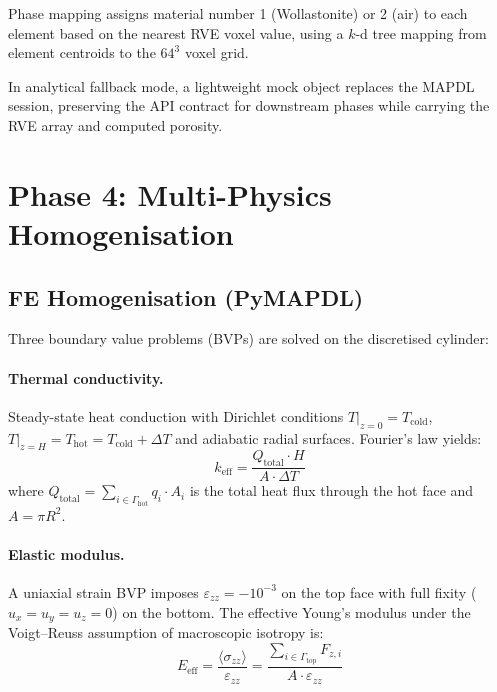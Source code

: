 \documentclass[11pt,a4paper]{article}
\begin{document}
Phase mapping assigns material number 1 (Wollastonite) or 2 (air) to each element based on the nearest RVE voxel value, using a $k$-d tree mapping from element centroids to the $64^3$ voxel grid.

In analytical fallback mode, a lightweight mock object replaces the MAPDL session, preserving the API contract for downstream phases while carrying the RVE array and computed porosity.

\section{Phase 4: Multi-Physics Homogenisation}
\label{sec:phase4}

\subsection{FE Homogenisation (PyMAPDL)}

Three boundary value problems (BVPs) are solved on the discretised cylinder:

\paragraph{Thermal conductivity.}
Steady-state heat conduction with Dirichlet conditions $T|_{z=0} = T_{\text{cold}}$, $T|_{z=H} = T_{\text{hot}} = T_{\text{cold}} + \Delta T$ and adiabatic radial surfaces. Fourier's law yields:
\begin{equation}
    k_{\text{eff}} = \frac{Q_{\text{total}} \cdot H}{A \cdot \Delta T}
    \label{eq:fourier}
\end{equation}
where $Q_{\text{total}} = \sum_{i \in \Gamma_{\text{hot}}} q_i \cdot A_i$ is the total heat flux through the hot face and $A = \pi R^2$.

\paragraph{Elastic modulus.}
A uniaxial strain BVP imposes $\varepsilon_{zz} = -10^{-3}$ on the top face with full fixity ($u_x = u_y = u_z = 0$) on the bottom. The effective Young's modulus under the Voigt--Reuss assumption of macroscopic isotropy is:
\begin{equation}
    E_{\text{eff}} = \frac{\langle \sigma_{zz} \rangle}{\varepsilon_{zz}} = \frac{\sum_{i \in \Gamma_{\text{top}}} F_{z,i}}{A \cdot \varepsilon_{zz}}
    \label{eq:youngs}
\end{equation}
\end{document}

